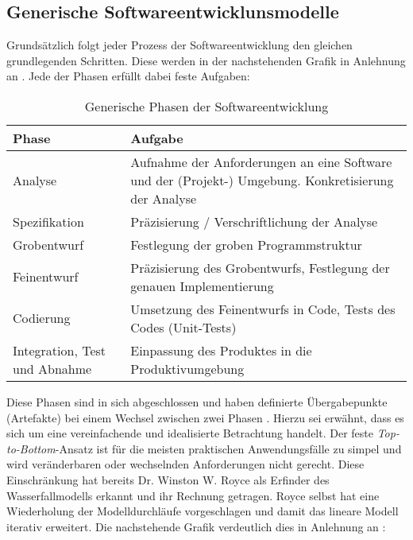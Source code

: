 \subsection{Generische Softwareentwicklunsmodelle}
\label{Generische Softwareentwicklunsmodelle}
Grundsätzlich folgt jeder Prozess der Softwareentwicklung den gleichen grundlegenden Schritten. Diese werden in der nachstehenden Grafik in Anlehnung an \cite[Abb. 9.1]{Ludwig_Lichter_2013}. Jede der Phasen erfüllt dabei feste Aufgaben:

    \begin{table}[!h]
        \centering
        \begin{tabular}{|p{4cm}|p{8cm}|}
            \hline
            Phase & Aufgabe\\
            \hline
            Analyse & Aufnahme der Anforderungen an eine Software und der (Projekt-) Umgebung. \glqq{}Konkretisierung der Analyse\grqq{} \cite[S. 155]{Ludwig_Lichter_2013}\\
            \hline
            Spezifikation & Präzisierung / Verschriftlichung der Analyse\\
            \hline
            Grobentwurf & Festlegung der groben Programmstruktur\\
            \hline
            Feinentwurf & Präzisierung des Grobentwurfs, Festlegung der genauen Implementierung\\
            \hline
            Codierung & Umsetzung des Feinentwurfs in Code, Tests des Codes (Unit-Tests)\\
            \hline
            Integration, Test und Abnahme & Einpassung des Produktes in die Produktivumgebung\\
            \hline
        \end{tabular}
            \caption{Generische Phasen der Softwareentwicklung}
            \label{Generische Phasen der Softwareentwicklung}
    \end{table}

Diese Phasen sind in sich abgeschlossen und haben definierte Übergabepunkte (Artefakte) bei einem Wechsel zwischen zwei Phasen \cite[S. 155]{Ludwig_Lichter_2013}. Hierzu sei erwähnt, dass es sich um eine vereinfachende und idealisierte Betrachtung handelt. Der feste \textit{Top-to-Bottom}-Ansatz ist für die meisten praktischen Anwendungsfälle zu simpel und wird veränderbaren oder wechselnden Anforderungen nicht gerecht. Diese Einschränkung hat bereits  Dr. Winston W. Royce als Erfinder des Wasserfallmodells \cite{royce1987managing} erkannt und ihr Rechnung getragen. Royce selbst hat eine Wiederholung der Modelldurchläufe vorgeschlagen \cite{Larmann_Basili_2003} und damit das lineare Modell iterativ erweitert. Die nachstehende Grafik verdeutlich dies in Anlehnung an \cite[Abb. 3]{royce1987managing}:



